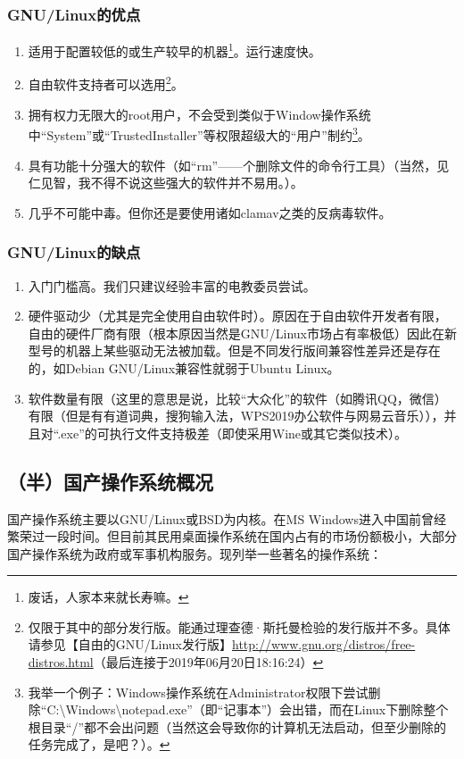 \documentclass{book}
\begin{document}
\subsubsection{GNU/Linux的优点}
\begin{enumerate}
	\item  适用于配置较低的或生产较早的机器\footnote{废话，人家本来就长寿嘛。}。运行速度快。\par
	\item 自由软件支持者可以选用\footnote{仅限于其中的部分发行版。能通过理查德·斯托曼检验的发行版并不多。具体请参见【自由的GNU/Linux发行版】\url{http://www.gnu.org/distros/free-distros.html}（最后连接于2019年06月20日18:16:24）}。\par
	\item 拥有权力无限大的root用户，不会受到类似于Window操作系统中“System”或“TrustedInstaller”等权限超级大的“用户”制约\footnote{我举一个例子：Windows操作系统在Administrator权限下尝试删除“C:\textbackslash Windows\textbackslash notepad.exe”（即“记事本”）会出错，而在Linux下删除整个根目录“/”都不会出问题（当然这会导致你的计算机无法启动，但至少删除的任务完成了，是吧？）。}。\par
	\item 具有功能十分强大的软件（如“rm”——个删除文件的命令行工具）（当然，见仁见智，我不得不说这些强大的软件并不易用。）。
	\item 几乎不可能中毒。但你还是要使用诸如clamav之类的反病毒软件。
\end{enumerate}
\subsubsection{GNU/Linux的缺点}
\begin{enumerate}
	\item 入门门槛高。我们只建议经验丰富的电教委员尝试。
	\item 硬件驱动少（尤其是完全使用自由软件时）。原因在于自由软件开发者有限，自由的硬件厂商有限（根本原因当然是GNU/Linux市场占有率极低）因此在新型号的机器上某些驱动无法被加载。但是不同发行版间兼容性差异还是存在的，如Debian GNU/Linux兼容性就弱于Ubuntu Linux。
	\item 软件数量有限（这里的意思是说，比较“大众化”的软件（如腾讯QQ，微信）有限（但是有有道词典，搜狗输入法，WPS2019办公软件与网易云音乐）），并且对“.exe”的可执行文件支持极差（即使采用Wine或其它类似技术）。	
\end{enumerate}
\subsection{（半）国产操作系统概况}
国产操作系统主要以GNU/Linux或BSD为内核。在MS Windows进入中国前曾经繁荣过一段时间。但目前其民用桌面操作系统在国内占有的市场份额极小，大部分国产操作系统为政府或军事机构服务。现列举一些著名的操作系统：
\end{document}
